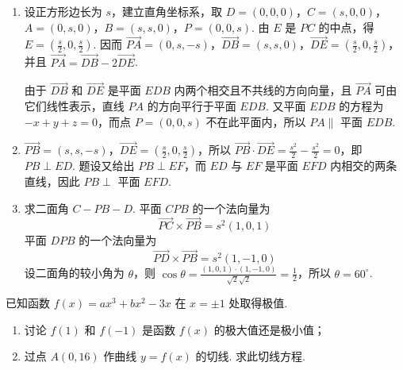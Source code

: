 \begin{solution}
\begin{enumerate}
\item 设正方形边长为 \(s\)，建立直角坐标系，取
\(D=(0,0,0)\)，\(C=(s,0,0)\)，\(A=(0,s,0)\)，\(B=(s,s,0)\)，\(P=(0,0,s)\).
由 \(E\) 是 \(PC\) 的中点，得 \(E=(\frac{s}{2},0,\frac{s}{2})\). 因而
\(\overrightarrow{PA}=(0,s,-s)\)，\(\overrightarrow{DB}=(s,s,0)\)，\(\overrightarrow{DE}=(\frac{s}{2},0,\frac{s}{2})\)，并且 \(\overrightarrow{PA}=\overrightarrow{DB}-2\overrightarrow{DE}\).

由于 \(\overrightarrow{DB}\) 和 \(\overrightarrow{DE}\) 是平面 \(EDB\) 内两个相交且不共线的方向向量，且 \(\overrightarrow{PA}\) 可由它们线性表示，直线 \(PA\) 的方向平行于平面 \(EDB\). 又平面 \(EDB\) 的方程为 \(-x+y+z=0\)，而点 \(P=(0,0,s)\) 不在此平面内，所以 \(PA\parallel\) 平面 \(EDB\).

\item \(\overrightarrow{PB}=(s,s,-s)\)，\(\overrightarrow{DE}=(\frac{s}{2},0,\frac{s}{2})\)，所以 \(\overrightarrow{PB}\cdot\overrightarrow{DE}=\frac{s^2}{2}-\frac{s^2}{2}=0\)，即 \(PB\perp ED\). 题设又给出 \(PB\perp EF\)，而 \(ED\) 与 \(EF\) 是平面 \(EFD\) 内相交的两条直线，因此 \(PB\perp\) 平面 \(EFD\).

\item 求二面角 \(C-PB-D\). 平面 \(CPB\) 的一个法向量为
\[
\overrightarrow{PC}\times\overrightarrow{PB}=s^2(1,0,1)
\]
平面 \(DPB\) 的一个法向量为
\[
\overrightarrow{PD}\times\overrightarrow{PB}=s^2(1,-1,0)
\]
设二面角的较小角为 \(\theta\)，则
\(\cos\theta=\frac{(1,0,1)\cdot(1,-1,0)}{\sqrt2\sqrt2}=\frac12\)，所以 \(\theta=60^{\circ}\).
\end{enumerate}
\end{solution}

\begin{problem}
已知函数 \(f(x) = ax^3 + bx^2 - 3x\) 在 \(x = \pm 1\) 处取得极值.

\begin{enumerate}
\item 讨论 \(f(1)\) 和 \(f(-1)\) 是函数 \(f(x)\) 的极大值还是极小值；
\item 过点 \(A(0,16)\) 作曲线 \(y = f(x)\) 的切线. 求此切线方程.
\end{enumerate}
\end{problem}

